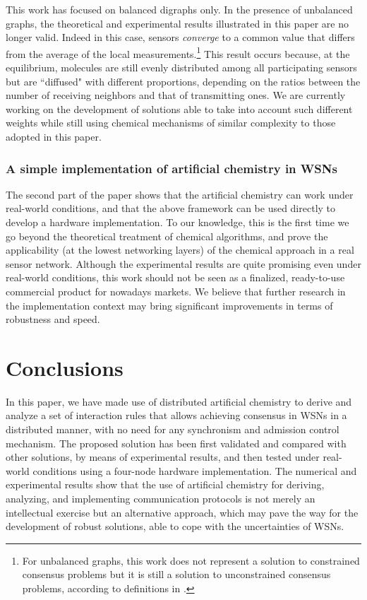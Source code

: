 \documentclass[journal]{IEEEtran}
\begin{document}
{{This work has focused on balanced digraphs only. In the presence of unbalanced graphs, the theoretical and experimental results illustrated in this paper are no longer valid. Indeed in this case, sensors \emph{converge} to a common value that differs from the average of the local measurements.\footnote{For unbalanced graphs, this work does not represent a solution to constrained consensus problems but it is still a solution to unconstrained consensus problems, according to definitions in \cite{OlFa07}.} This result occurs because, at the equilibrium, molecules are still evenly distributed among all participating sensors but {are ``diffused" with different proportions}, depending on the ratios between the number of receiving neighbors and that of transmitting ones. We are currently working on the development of solutions able to take into account such different weights while still using chemical mechanisms of similar complexity to those adopted in this paper. }

\subsubsection{A simple implementation of artificial chemistry in WSNs}
{The second part of the paper shows that the artificial chemistry can work under real-world conditions, and that the above framework can be used directly to develop a hardware implementation. To our knowledge, this is the first time we go beyond the theoretical treatment of chemical algorithms, and prove the applicability (at the lowest networking layers) of the chemical approach in a real sensor network. 
Although the experimental results are quite promising even under real-world conditions, this work should not be seen as a finalized, ready-to-use commercial product for nowadays markets. We believe that further research in the implementation context may bring significant improvements in terms of robustness and speed.
}

\section{Conclusions}
\label{sec:Conclusion}


In this paper, we have made use of distributed artificial chemistry to derive and analyze a set of interaction rules that allows achieving consensus in WSNs in a distributed manner, with no need for any synchronism and admission control mechanism. The proposed solution has been first validated and compared with other solutions, by means of experimental results, and then tested under real-world conditions using a four-node hardware implementation. The numerical and experimental results show that the use of artificial chemistry for deriving, analyzing, and implementing communication protocols is not merely an intellectual exercise but an {alternative} approach, which may pave the way for the development of robust solutions, able to cope with the uncertainties of WSNs. 

}
\end{document}
